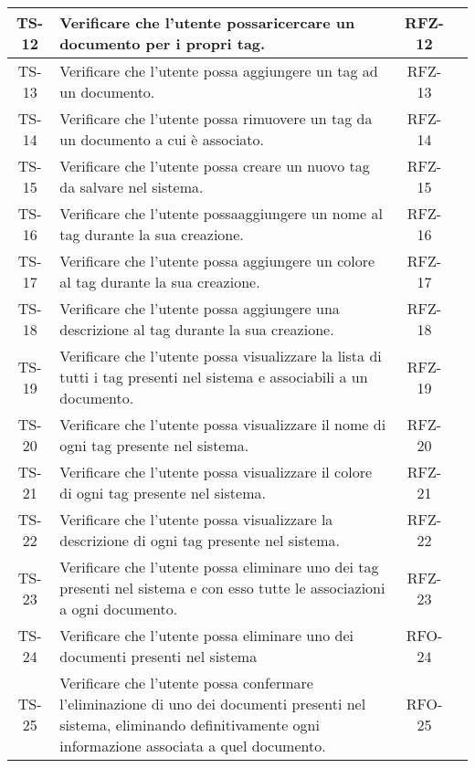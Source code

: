 \begin{xltabular}{\textwidth}{| c | X | c | c |}
    \hline
    TS-12 & Verificare che l’utente possaricercare un documento per i propri tag. & RFZ-12 & \textcolor{xmarkcolor}{} \\
    \hline
    TS-13 & Verificare che l’utente possa aggiungere un tag ad un documento. & RFZ-13 & \textcolor{xmarkcolor}{} \\
    \hline
    TS-14 & Verificare che l’utente possa rimuovere un tag da un documento a cui è associato. & RFZ-14 & \textcolor{xmarkcolor}{} \\
    \hline
    TS-15 & Verificare che l’utente possa creare un nuovo tag da salvare nel sistema. & RFZ-15 & \textcolor{xmarkcolor}{} \\
    \hline
    TS-16 & Verificare che l’utente possaaggiungere un nome al tag durante la sua creazione. & RFZ-16 & \textcolor{xmarkcolor}{} \\
    \hline
    TS-17 & Verificare che l’utente possa aggiungere un colore al tag durante la sua creazione. & RFZ-17 & \textcolor{xmarkcolor}{} \\
    \hline
    TS-18 & Verificare che l’utente possa aggiungere una descrizione al tag durante la sua creazione. & RFZ-18 & \textcolor{xmarkcolor}{} \\
    \hline
    TS-19 &  Verificare che l’utente possa visualizzare la lista di tutti i tag presenti nel sistema e associabili a un documento. & RFZ-19 & \textcolor{xmarkcolor}{} \\
    \hline
    TS-20 & Verificare che l'utente possa visualizzare il nome di ogni tag presente nel sistema. & RFZ-20 & \textcolor{xmarkcolor}{} \\
    \hline
    TS-21 & Verificare che l’utente possa visualizzare il colore di ogni tag presente nel sistema. & RFZ-21 & \textcolor{xmarkcolor}{} \\
    \hline
    TS-22 & Verificare che l’utente possa visualizzare la descrizione di ogni tag presente nel sistema. & RFZ-22 & \textcolor{xmarkcolor}{} \\
    \hline
    TS-23 & Verificare che l’utente possa eliminare uno dei tag presenti nel sistema e con esso tutte le associazioni a ogni documento. & RFZ-23 & \textcolor{xmarkcolor}{} \\
    \hline
    TS-24 & Verificare che l’utente possa eliminare uno dei documenti presenti nel sistema & RFO-24 & \textcolor{xmarkcolor}{} \\
    \hline
    TS-25 & Verificare che l’utente possa confermare l’eliminazione di uno dei documenti presenti nel sistema, eliminando definitivamente  ogni informazione associata a quel documento. & RFO-25 & \textcolor{xmarkcolor}{} \\

\end{xltabular}
